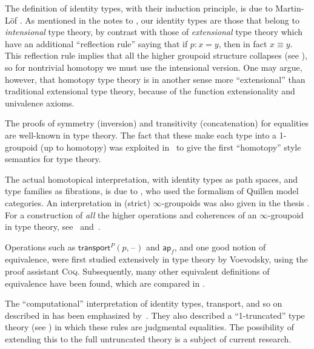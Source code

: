 \documentclass[12pt]{article}
\newcommand{\blank}{\mathord{\hspace{1pt}\text{--}\hspace{1pt}}}
\newcommand{\Coq}{\textsc{Coq}\xspace}
\newcommand{\jdeq}{\equiv}
\newcommand{\mapfunc}[1]{\ensuremath{\mathsf{ap}_{#1}}\xspace}
\newcommand{\transfib}[3]{\ensuremath{\mathsf{transport}^{#1}(#2,#3)\xspace}}
\let\apfunc\mapfunc
\begin{document}
The definition of identity types, with their induction principle, is due to Martin-L\"of \cite{Martin-Lof-1972}.
%
%
%
%
%
As mentioned in the notes to , our identity types are those that belong to \emph{intensional} type theory, by contrast with those of \emph{extensional} type theory which have an additional ``reflection rule'' saying that if $p:x=y$, then in fact $x\jdeq y$.
This reflection rule implies that all the higher groupoid structure collapses (see ), so for nontrivial homotopy we must use the intensional version. 
One may argue, however, that homotopy type theory is in another sense more ``extensional'' than traditional extensional type theory, because of the function extensionality and univalence axioms.  

The proofs of symmetry (inversion) and transitivity (concatenation) for equalities are well-known in type theory.
The fact that these make each type into a 1-groupoid (up to homotopy) was exploited in~\cite{hs:gpd-typethy} to give the first ``homotopy'' style semantics for type theory.  

The actual homotopical interpretation, with identity types as path spaces, and type families as fibrations, is due to \cite{AW}, who used the formalism of Quillen model categories.  An interpretation in (strict) $\infty$-groupoids was also given in the thesis \cite{mw:thesis}.
For a construction of \emph{all} the higher operations and coherences of an $\infty$-groupoid in type theory, see~\cite{pll:wkom-type} and~\cite{bg:type-wkom}.

%
Operations such as $\transfib{P}{p}{\blank}$ and $\apfunc{f}$, and one good notion of equivalence, were first studied extensively in type theory by Voevodsky, using the proof assistant \Coq.
Subsequently, many other equivalent definitions of equivalence have been found, which are compared in .

The ``computational'' interpretation of identity types, transport, and so on described in  has been emphasized by~\cite{lh:canonicity}.
They also described a ``1-truncated'' type theory (see ) in which these rules are judgmental equalities.
The possibility of extending this to the full untruncated theory is a subject of current research.
\end{document}
